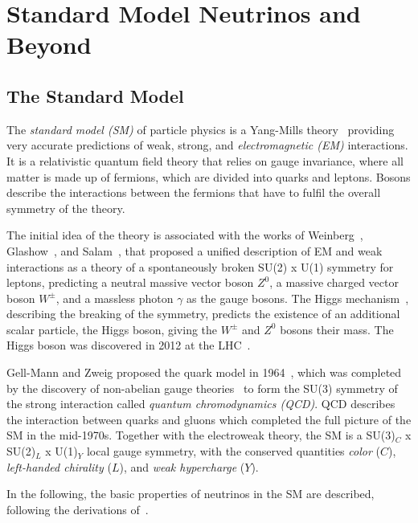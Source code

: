\setchapterpreamble[u]{\margintoc}

\chapter{Standard Model Neutrinos and Beyond}


\section{The Standard Model}

The \textit{standard model (SM)} of particle physics is a Yang-Mills theory~ providing very accurate predictions of weak, strong, and \textit{electromagnetic (EM)} interactions. It is a relativistic quantum field theory that relies on gauge invariance, where all matter is made up of fermions, which are divided into quarks and leptons. Bosons describe the interactions between the fermions that have to fulfil the overall symmetry of the theory.

The initial idea of the theory is associated with the works of Weinberg~, Glashow~, and Salam~\cite{Salam}, that proposed a unified description of EM and weak interactions as a theory of a spontaneously broken SU(2) x U(1) symmetry for leptons, predicting a neutral massive vector boson $Z^0$, a massive charged vector boson $W^\pm$, and a massless photon $\gamma$ as the gauge bosons. The Higgs mechanism~, describing the breaking of the symmetry, predicts the existence of an additional scalar particle, the Higgs boson, giving the $W^\pm$ and $Z^0$ bosons their mass. The Higgs boson was discovered in 2012 at the LHC~\cite{higgs_discovery_cms, higgs_discovery_atlas}.

Gell-Mann and Zweig proposed the quark model in 1964~, which was completed by the discovery of non-abelian gauge theories~\cite{non_abel_gauge} to form the SU(3) symmetry of the strong interaction called \textit{quantum chromodynamics (QCD)}. QCD describes the interaction between quarks and gluons which completed the full picture of the SM in the mid-1970s. Together with the electroweak theory, the SM is a SU(3)$_C$ x SU(2)$_L$ x U(1)$_Y$ local gauge symmetry, with the conserved quantities \textit{color} ($C$), \textit{left-handed chirality} ($L$), and \textit{weak hypercharge} ($Y$).

In the following, the basic properties of neutrinos in the SM are described, following the derivations of~.



